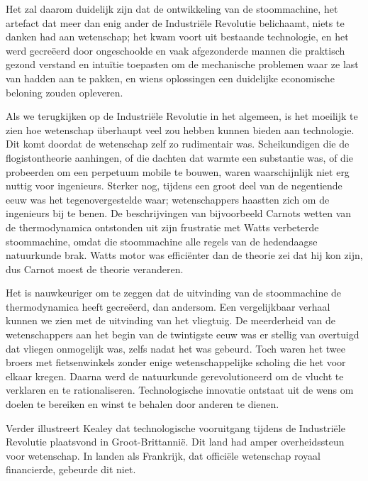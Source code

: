 \begin{blockquotebox}
    Het zal daarom duidelijk zijn dat de ontwikkeling van de stoommachine, het artefact dat meer dan enig ander de Industriële Revolutie belichaamt, niets te danken had aan wetenschap; het kwam voort uit bestaande technologie, en het werd gecreëerd door ongeschoolde en vaak afgezonderde mannen die praktisch gezond verstand en intuïtie toepasten om de mechanische problemen waar ze last van hadden aan te pakken, en wiens oplossingen een duidelijke economische beloning zouden opleveren.
    \par\vspace{1em}\noindent
    Als we terugkijken op de Industriële Revolutie in het algemeen, is het moeilijk te zien hoe wetenschap überhaupt veel zou hebben kunnen bieden aan technologie. Dit komt doordat de wetenschap zelf zo rudimentair was. Scheikundigen die de flogistontheorie aanhingen, of die dachten dat warmte een substantie was, of die probeerden om een perpetuum mobile te bouwen, waren waarschijnlijk niet erg nuttig voor ingenieurs. Sterker nog, tijdens een groot deel van de negentiende eeuw was het tegenovergestelde waar; wetenschappers haastten zich om de ingenieurs bij te benen. De beschrijvingen van bijvoorbeeld Carnots wetten van de thermodynamica ontstonden uit zijn frustratie met Watt\textquotesingle s verbeterde stoommachine, omdat die stoommachine alle regels van de hedendaagse natuurkunde brak. Watt\textquotesingle s motor was efficiënter dan de theorie zei dat hij kon zijn, dus Carnot moest de theorie veranderen.\footnotemark
\end{blockquotebox}

Het is nauwkeuriger om te zeggen dat de uitvinding van de stoommachine de thermodynamica heeft gecreëerd, dan andersom. Een vergelijkbaar verhaal kunnen we zien met de uitvinding van het vliegtuig. De meerderheid van de wetenschappers aan het begin van de twintigste eeuw was er stellig van overtuigd dat vliegen onmogelijk was, \autocite{80} zelfs nadat het was gebeurd. Toch waren het twee broers met fietsenwinkels zonder enige wetenschappelijke scholing die het voor elkaar kregen. Daarna werd de natuurkunde gerevolutioneerd om de vlucht te verklaren en te rationaliseren. Technologische innovatie ontstaat uit de wens om doelen te bereiken en winst te behalen door anderen te dienen.

Verder illustreert Kealey dat technologische vooruitgang tijdens de Industriële Revolutie plaatsvond in Groot-Brittannië. Dit land had amper overheidssteun voor wetenschap. In landen als Frankrijk, dat officiële wetenschap royaal financierde, gebeurde dit niet.

